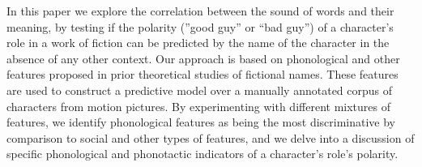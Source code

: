In this paper we explore the correlation between the sound of words and their meaning, by testing if the polarity (''good guy'' or ``bad guy'') of a character's role in a work of fiction can be predicted by the name of the character in the absence of any other context. Our approach is based on phonological and other features proposed in prior theoretical studies of fictional names. These features are used to construct a predictive model over a manually annotated corpus of characters from motion pictures. By experimenting with different mixtures of features, we identify phonological features as being the most discriminative by comparison to social and other types of features, and we delve into a discussion of specific phonological and phonotactic indicators of a character's role's polarity.
